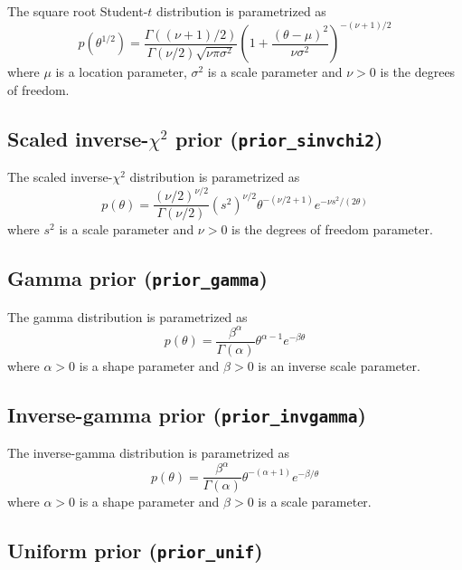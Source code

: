 \documentclass[twoside,11pt]{article}
\newcommand{\code}[1]{{\normalfont\texttt{#1}}}
\begin{document}
The square root Student-$t$ distribution is parametrized as
\begin{equation}
p(\theta^{1/2})=\frac{\Gamma((\nu+1)/2)}{\Gamma(\nu/2)\sqrt{\nu\pi\sigma^2}}\left(1+\frac{(\theta-\mu)^2}{\nu\sigma^2}\right)^{-(\nu+1)/2}
\end{equation}
where $\mu$ is a location parameter, $\sigma^2$ is a scale
parameter and $\nu>0$ is the degrees of freedom.

\subsection*{Scaled inverse-$\chi^2$ prior (\code{prior\_sinvchi2})}


The scaled inverse-$\chi^2$ distribution is parametrized as
\begin{equation}
p(\theta)=\frac{(\nu/2)^{\nu/2}}{\Gamma(\nu/2)}(s^2)^{\nu/2}\theta^{-(\nu/2+1)}e^{-\nu s^2/(2\theta)}
\end{equation}
where $s^2$ is a scale parameter and $\nu>0$ is the degrees of freedom
parameter.

\subsection*{Gamma prior (\code{prior\_gamma})}

The gamma distribution is parametrized as
\begin{equation}
p(\theta)=\frac{\beta^{\alpha}}{\Gamma(\alpha)}\theta^{\alpha-1}e^{-\beta\theta}
\end{equation}
where $\alpha>0$ is a shape parameter and $\beta>0$ is an inverse
scale parameter.

\subsection*{Inverse-gamma prior (\code{prior\_invgamma})}

The inverse-gamma distribution is parametrized as
\begin{equation}
p(\theta)=\frac{\beta^{\alpha}}{\Gamma(\alpha)}\theta^{-(\alpha+1)}e^{-\beta/\theta}
\end{equation}
where $\alpha>0$ is a shape parameter and $\beta>0$ is a scale
parameter.

\subsection*{Uniform prior (\code{prior\_unif})}
\end{document}
